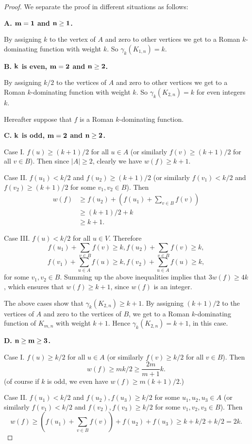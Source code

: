 \documentclass[12pt]{amsart}
\begin{document}
\begin{proof}
We separate the proof in different situations as follows:

\textbf{A.  ${\bf m=1}$ and ${\bf n\geq 1}$.} 

By assigning $k$ to the vertex of $A$ and zero to other vertices we get to a Roman $k$-dominating function with weight $k$. So $\gamma_k (K_{1,n})=k$. 

\textbf{B. ${\bf k}$ is even, ${\bf m=2}$ and ${\bf n\geq 2}$.} 

By assigning $k/2$ to the vertices of $A$ and zero to other vertices we get to a Roman $k$-dominating function with weight $k$. So $\gamma_k (K_{2,n})=k$ for even integers $k$. 

Hereafter suppose that $f$ is a Roman $k$-dominating function.

\textbf{C. ${\bf k}$ is odd, ${\bf m=2}$ and ${\bf n\geq 2}$.} 

Case I. $f(u)\geq (k+1)/2$ for all $u\in A$ (or similarly $f(v)\geq (k+1)/2$ for all $v\in B$). Then since $|A|\geq 2$, clearly we have $w(f)\geq k+1$.

Case II.  $f(u_1)<k/2$ and $f(u_2)\geq (k+1)/2$ (or similarly $f(v_1)<k/2$ and $f(v_2)\geq (k+1)/2$ for some $v_1, v_2\in B$). Then 
\begin{align*}
w(f)&\geq f(u_2)+(f(u_1)+\sum_{v\in B}f(v))\\
&\geq (k+1)/2+k\\
&\geq k+1.
\end{align*}

Case III.  $f(u)<k/2$ for all $u\in V$. Therefore
$$f(u_1)+\sum_{v\in B}f(v)\geq k, f(u_2)+\sum_{v\in B}f(v)\geq k,$$
$$f(v_1)+\sum_{u\in A}f(u)\geq k, f(v_2)+\sum_{u\in A}f(u)\geq k,$$
for some $v_1, v_2\in B$.
Summing up the above inequalities implies that $3w(f)\geq 4k$, which ensures that $w(f)\geq k+1$, since $w(f)$ is an integer.

The above cases show that $\gamma_k(K_{2,n})\geq k+1$. By assigning $(k+1)/2$ to the vertices of $A$ and zero to the vertices of $B$, we get to a Roman $k$-dominating function of $K_{m,n}$ with weight $k+1$. Hence $\gamma_k(K_{2,n})=k+1$,
in this case.


\textbf{D. ${\bf n\geq m\geq 3}$.}

Case I.  $f(u)\geq k/2$ for all $u\in A$ (or similarly $f(v)\geq k/2$ for all $v\in B$). Then 
$$w(f)\geq mk/2\geq \frac{2m}{m+1}k.$$
(of course if $k$ is odd, we even have  $w(f)\geq m(k+1)/2$.)

Case II.  $f(u_1)<k/2$ and $f(u_2), f(u_3)\geq k/2$ for some $u_1, u_2, u_3\in A$ (or similarly  $f(v_1)<k/2$ and  $f(v_2), f(v_3)\geq k/2$ for some $v_1, v_2,v_3\in B$). Then 
$$w(f)\geq (f(u_1)+\sum_{v\in B}f(v))+f(u_2)+f(u_3)\geq k+k/2+k/2=2k.$$


\end{proof}
\end{document}
